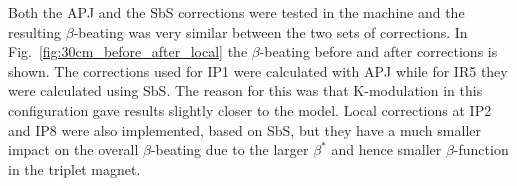 \documentclass{cernatsnote}
\begin{document}
\begin{table}[h]
\centering
\caption{The measured $\beta^*$ before and after the Local Corrections were trimmed in for the $\beta^*=$~30~cm optics.}\label{tab:betaIP}
\end{table}

Both the APJ and the SbS corrections were tested in the machine and the resulting $\beta$-beating was very similar between the two sets of corrections. In Fig.~\ref{fig:30cm_before_after_local} the $\beta$-beating before and after corrections is shown. The corrections used for IP1 were calculated with APJ while for IR5 they were calculated using SbS. The reason for this was that K-modulation in this configuration gave results slightly closer to the model. Local corrections at IP2 and IP8 were also implemented, based on SbS, but they have a much smaller impact on the overall $\beta$-beating due to the larger $\beta^*$ and hence smaller $\beta$-function in the triplet magnet. 
\end{document}

